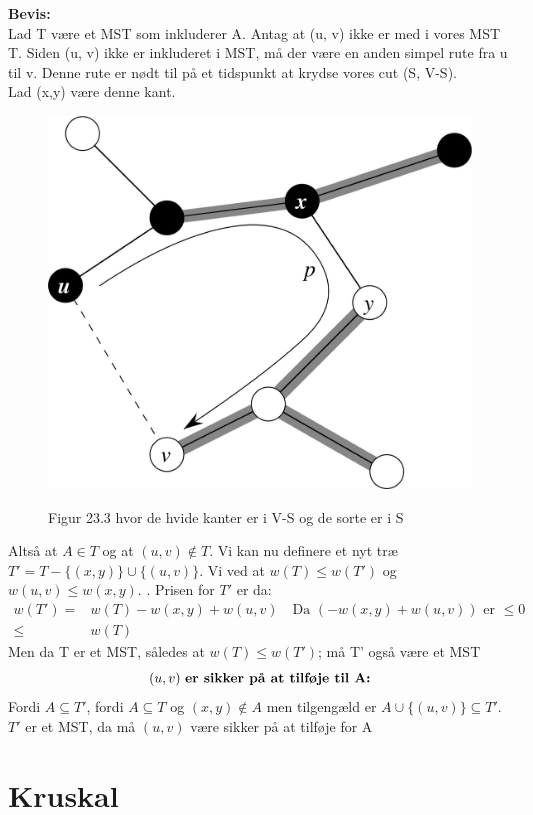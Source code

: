 \documentclass[11pt,a4paper]{report}
\theoremstyle{plain}
\theoremstyle{definition}
\theoremstyle{remark}
\numberwithin{equation}{section}
\begin{document}
\textbf{Bevis:}\\
Lad T være et MST som inkluderer A. Antag at (u, v) ikke er med i vores MST T. Siden (u, v) ikke er inkluderet i MST, må der være en anden simpel rute fra u til v. Denne rute er nødt til på et tidspunkt at krydse vores cut (S, V-S).\\
Lad (x,y) være denne kant.

\begin{figure}[H]
  \centering
  \includegraphics[scale=0.15]{figur233.jpg}\\
  \caption{Figur 23.3 hvor de hvide kanter er i V-S og de sorte er i S}
\end{figure}
Altså at $A\in T$ og at $(u,v)\notin T$. Vi kan nu definere et nyt træ $T' = T - \{(x,y)\} \cup \{(u,v)\}$. Vi ved at $w(T) \leq w(T')$ og $w(u,v) \leq w(x,y)$. .  Prisen for $T'$ er da:
\begin{align*}
w(T') =& w(T) - w(x,y) + w(u,v) \quad \text{Da } (- w(x,y) + w(u,v)) \text{ er } \leq 0 \\
 \leq & w(T)
\end{align*}
Men da T er et MST, således at $w(T) \leq w(T')$; må T' også være et MST
\[
(u,v) \text{ \textbf{er sikker på at tilføje til A:}}
\]
Fordi $A \subseteq T'$, fordi $A \subseteq T$ og $(x,y) \notin A$ men tilgengæld er $A \cup \{(u,v)\} \subseteq T'$. $T'$ er et MST, da må $(u,v)$ være sikker på at tilføje for A


\section{Kruskal}
\end{document}
